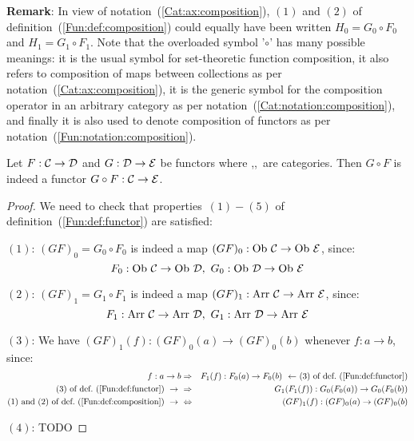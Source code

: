 \noindent
{\bf Remark}: In view of notation~(\ref{Cat:ax:composition}), $(1)$ and $(2)$ of
definition~(\ref{Fun:def:composition}) could equally have been written
$H_{0}=G_{0}\circ F_{0}$ and $H_{1}=G_{1}\circ F_{1}$. Note that the overloaded
symbol '$\circ$' has many possible meanings: it is the usual symbol for
set-theoretic function composition, it also refers to composition of maps
between collections as per notation~(\ref{Cat:ax:composition}), it is the 
generic symbol for the composition operator in an arbitrary category as
per notation~(\ref{Cat:notation:composition}), and finally it is also used to
denote composition of functors as per notation~(\ref{Fun:notation:composition}).
\begin{prop}\label{Fun:prop:composition}
    Let $F:\mbox{$\cal C$}\to\mbox{$\cal D$}$ and $G:\mbox{$\cal D$}\to\mbox{$\cal E$}$ be functors where \Cat,\Dat,\Eat\ 
    are categories. Then $G\circ F$ is indeed a functor $G\circ F:\mbox{$\cal C$}\to\mbox{$\cal E$}$.
\end{prop}
\begin{proof}
    We need to check that properties~$(1)-(5)$ of 
    definition~(\ref{Fun:def:functor}) are satisfied:

    $(1)$: $(GF)_{0}=G_{0}\circ F_{0}$ is indeed a map $(GF)_{0}:\mbox{\rm Ob}\ \mbox{$\cal C$}
    \to\mbox{\rm Ob}\ \mbox{$\cal E$}$, since: 
        \[
            F_{0}:\ob\ \Cat\to\ob\ \Dat,\  G_{0}:\ob\ \Dat\to\ob\ \Eat
        \]

    $(2)$: $(GF)_{1}=G_{1}\circ F_{1}$ is indeed a map $(GF)_{1}:\mbox{\rm Arr}\ \mbox{$\cal C$}
    \to\mbox{\rm Arr}\ \mbox{$\cal E$}$, since: 
        \[
            F_{1}:\arr\ \Cat\to\arr\ \Dat,\  G_{1}:\arr\ \Dat\to\arr\ \Eat
        \]

    $(3)$: We have $(GF)_{1}(f) : (GF)_{0}(a)\to(GF)_{0}(b)$ whenever $f:a\to b$, 
    since:
        \begin{eqnarray*}f:a\to b
            &\Rightarrow& F_{1}(f):F_{0}(a)\to F_{0}(b) 
            \mbox{\ \ $\leftarrow$\ $(3)$ of def.~(\ref{Fun:def:functor})}\\ 
            \mbox{$(3)$ of def.~(\ref{Fun:def:functor})}\ \to\ 
            &\Rightarrow& G_{1}(F_{1}(f)):G_{0}(F_{0}(a))\to G_{0}(F_{0}(b))\\
            \mbox{$(1)$ and $(2)$ of def.~(\ref{Fun:def:composition})}\ \to\ 
            &\Leftrightarrow& (GF)_{1}(f):(GF)_{0}(a)\to (GF)_{0}(b)
        \end{eqnarray*}

    $(4)$: TODO
\end{proof}

